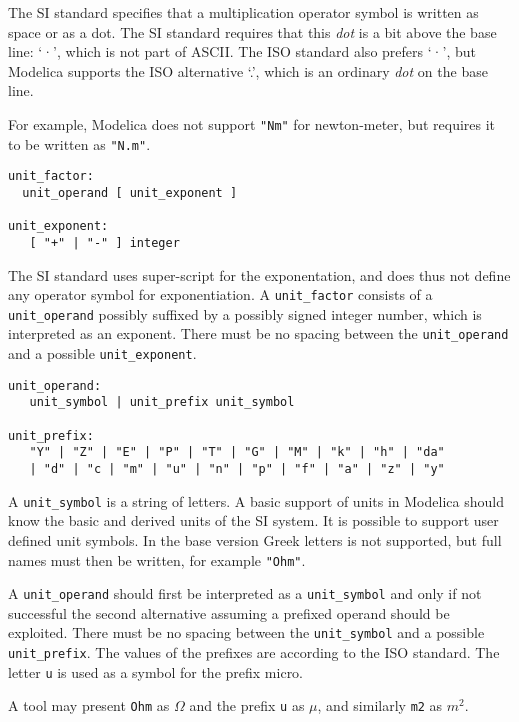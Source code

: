 The SI standard specifies that a multiplication operator symbol is written as space
or as a dot. The SI standard requires that this \emph{dot} is a bit above the base line: `·', which is not part of ASCII.
The ISO standard also prefers `·', but Modelica supports the ISO alternative `.', which is an ordinary \emph{dot} on the base line.

For example, Modelica does not support \lstinline!"Nm"! for newton-meter,
but requires it to be written as \lstinline!"N.m"!.

\begin{lstlisting}[language=grammar]
unit_factor:
  unit_operand [ unit_exponent ]

unit_exponent:
   [ "+" | "-" ] integer
\end{lstlisting}

The SI standard uses super-script for the exponentation, and does thus not define any operator symbol for exponentiation.
A \lstinline!unit_factor! consists of a \lstinline!unit_operand! possibly suffixed by a
possibly signed integer number, which is interpreted as an exponent.
There must be no spacing between the \lstinline!unit_operand! and a possible
\lstinline!unit_exponent!.

\begin{lstlisting}[language=grammar]
unit_operand:
   unit_symbol | unit_prefix unit_symbol

unit_prefix:
   "Y" | "Z" | "E" | "P" | "T" | "G" | "M" | "k" | "h" | "da"
   | "d" | "c | "m" | "u" | "n" | "p" | "f" | "a" | "z" | "y"
\end{lstlisting}

A \lstinline!unit_symbol! is a string of letters. A basic support of units in
Modelica should know the basic and derived units of the SI system. It is
possible to support user defined unit symbols. In the base version Greek
letters is not supported, but full names must then be written, for
example \lstinline!"Ohm"!.

A \lstinline!unit_operand! should first be interpreted as a \lstinline!unit_symbol! and only
if not successful the second alternative assuming a prefixed operand
should be exploited. There must be no spacing between the \lstinline!unit_symbol!
and a possible \lstinline!unit_prefix!. The values of the prefixes are according to
the ISO standard. The letter \lstinline!u! is used as a symbol for the prefix
micro.

\begin{nonnormative}
A tool may present \lstinline!Ohm! as $\Omega$ and the prefix \lstinline!u! as $\mu$, and similarly \lstinline!m2! as $m^2$.
\end{nonnormative}

